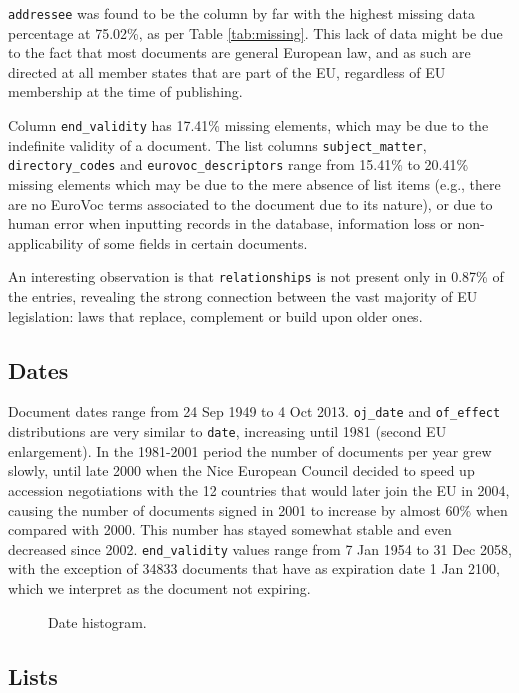 \documentclass[sigconf, authorversion]{acmart}
\begin{document}
\texttt{addressee} was found to be the column by far with the highest missing data percentage at 75.02\%, as per Table \ref{tab:missing}. This lack of data might be due to the fact that most documents are general European law, and as such are directed at all member states that are part of the EU, regardless of EU membership at the time of publishing.

Column \texttt{end\_validity} has 17.41\% missing elements, which may be due to the indefinite validity of a document. The list columns \texttt{subject\_matter}, \texttt{directory\_codes} and \texttt{eurovoc\_descriptors} range from 15.41\% to 20.41\% missing elements which may be due to the mere absence of list items (e.g., there are no EuroVoc terms associated to the document due to its nature), or due to human error when inputting records in the database, information loss or non-applicability of some fields in certain documents.\par

An interesting observation is that \texttt{relationships} is not present only in 0.87\% of the entries, revealing the strong connection between the vast majority of EU legislation: laws that replace, complement or build upon older ones.

\subsection{Dates}

Document dates range from 24 Sep 1949 to 4 Oct 2013. \texttt{oj\_date} and \texttt{of\_effect} distributions are very similar to \texttt{date}, increasing until 1981 (second EU enlargement). In the 1981-2001 period the number of documents per year grew slowly, until late 2000 when the Nice European Council decided to speed up accession negotiations with the 12 countries that would later join the EU in 2004, causing the number of documents signed in 2001 to increase by almost $60\%$ when compared with 2000. 
This number has stayed somewhat stable and even decreased since 2002. \texttt{end\_validity} values range from 7 Jan 1954 to 31 Dec 2058, with the exception of \SI{34833}{} documents that have as expiration date 1 Jan 2100, which we interpret as the document not expiring.

\begin{figure}[H]
  
  \caption{Date histogram.}
\end{figure}

\subsection{Lists}
\end{document}
